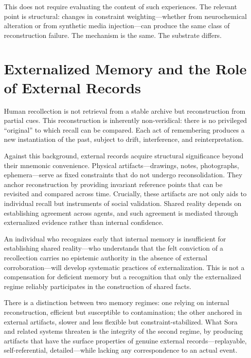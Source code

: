 \documentclass[12pt, letterpaper]{article}
\theoremstyle{flyxion}
\begin{document}
This does not require evaluating the content of such experiences. The relevant point is structural: changes in constraint weighting---whether from neurochemical alteration or from synthetic media injection---can produce the same class of reconstruction failure. The mechanism is the same. The substrate differs.

\section{Externalized Memory and the Role of External Records}

Human recollection is not retrieval from a stable archive but reconstruction from partial cues. This reconstruction is inherently non-veridical: there is no privileged ``original'' to which recall can be compared. Each act of remembering produces a new instantiation of the past, subject to drift, interference, and reinterpretation.

Against this background, external records acquire structural significance beyond their mnemonic convenience. Physical artifacts---drawings, notes, photographs, ephemera---serve as fixed constraints that do not undergo reconsolidation. They anchor reconstruction by providing invariant reference points that can be revisited and compared across time. Crucially, these artifacts are not only aids to individual recall but instruments of social validation. Shared reality depends on establishing agreement across agents, and such agreement is mediated through externalized evidence rather than internal confidence.

An individual who recognizes early that internal memory is insufficient for establishing shared reality---who understands that the felt conviction of a recollection carries no epistemic authority in the absence of external corroboration---will develop systematic practices of externalization. This is not a compensation for deficient memory but a recognition that only the externalized regime reliably participates in the construction of shared facts.

There is a distinction between two memory regimes: one relying on internal reconstruction, efficient but susceptible to contamination; the other anchored in external artifacts, slower and less flexible but constraint-stabilized. What Sora and related systems threaten is the integrity of the second regime, by producing artifacts that have the surface properties of genuine external records---replayable, self-referential, detailed---while lacking any correspondence to an actual event.
\end{document}
